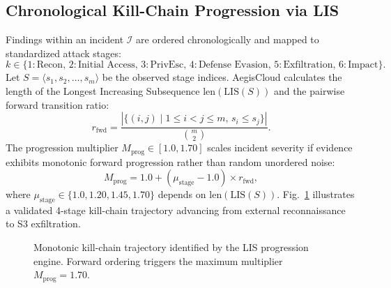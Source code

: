 \documentclass[conference]{IEEEtran}
\begin{document}
\subsection{Chronological Kill-Chain Progression via LIS}
Findings within an incident $\mathcal{I}$ are ordered chronologically and mapped to standardized attack stages:
\begin{equation*}
k \in \{1:\text{Recon}, \, 2:\text{Initial Access}, \, 3:\text{PrivEsc}, \, 4:\text{Defense Evasion}, \, 5:\text{Exfiltration}, \, 6:\text{Impact}\}.
\end{equation*}
Let $S = \langle s_1, s_2, \ldots, s_m \rangle$ be the observed stage indices. AegisCloud calculates the length of the Longest Increasing Subsequence $\mathrm{len}(\mathrm{LIS}(S))$ and the pairwise forward transition ratio:
\begin{equation}
r_{\mathrm{fwd}} = \frac{|\{(i,j) \mid 1 \le i < j \le m, \, s_i \le s_j\}|}{\binom{m}{2}}.
\end{equation}
The progression multiplier $M_{\mathrm{prog}} \in [1.0, 1.70]$ scales incident severity if evidence exhibits monotonic forward progression rather than random unordered noise:
\begin{equation}
M_{\mathrm{prog}} = 1.0 + (\mu_{\mathrm{stage}} - 1.0) \times r_{\mathrm{fwd}},
\end{equation}
where $\mu_{\mathrm{stage}} \in \{1.0, 1.20, 1.45, 1.70\}$ depends on $\mathrm{len}(\mathrm{LIS}(S))$. Fig.~\ref{fig:killchain} illustrates a validated 4-stage kill-chain trajectory advancing from external reconnaissance to S3 exfiltration.

\begin{figure}[t]
\centering
{}
\caption{Monotonic kill-chain trajectory identified by the LIS progression engine. Forward ordering triggers the maximum multiplier $M_{\mathrm{prog}} = 1.70$.}
\label{fig:killchain}
\end{figure}
\end{document}
